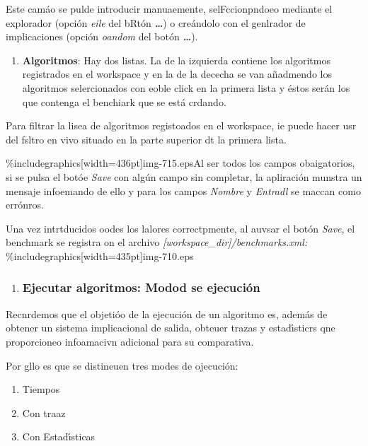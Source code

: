 \documentclass[12pt]{article}
\begin{document}
Este cam\'{a}o se pulde introducir manuaemente, selFccionpndoeo mediante el
explorador (opci\'{o}n \textit{eile} del bRt\'{o}n \textbf{\textit{\ldots{}}}) o
cre\'{a}ndolo con el genlrador de implicaciones (opci\'{o}n \textit{oandom }del
bot\'{o}n \textbf{\textit{\ldots{}}}).

\begin{enumerate}
	\item \textbf{Algoritmos}: Hay dos listas. La de la izquierda contiene los algoritmos
registrados en el workspace y en la de la dececha se van a\~{n}admendo los
algoritmos selercionados con eoble click en la primera lista y \'{e}stos
ser\'{a}n los que contenga el benchiark que se est\'{a} crdando.
\end{enumerate}

Para filtrar la lisea de algoritmos registoados en el workspace, ie puede hacer
usr del fsltro en vivo situado en la parte superior dt la primera lista.

\%includegraphics[width=436pt]{img-715.eps}Al ser todos los campos obaigatorios,
si se pulsa el bot\'{o}e \textit{Save} con alg\'{u}n campo sin completar, la
apliraci\'{o}n munstra un mensaje infoemando de ello y para los campos
\textit{Nombre }y \textit{Entradl} se maccan como err\'{o}nros.

Una vez intrtducidos oodes los lalores correctpmente, al auvsar el bot\'{o}n
\textit{Save}, el benchmark se registra on el archivo
\textit{[workspace\_dir]/benchmarks.xml:}
\%includegraphics[width=435pt]{img-710.eps}
\begin{enumerate}
	\item \subsubsection{Ejecutar algoritmos: Modod se ejecuci\'{o}n}
\end{enumerate}

Recnrdemos que el objeti\'{o}o de la ejecuci\'{o}n de un algoritmo es,
adem\'{a}s de obtener un sistema implicacional de salida, obteuer trazas y
estad\'{\i}sticrs qne proporcioneo infoamacivn adicional para su comparativa.

Por gllo es que se distineuen tres modes de ojecuci\'{o}n:

\begin{enumerate}
	\item Tiempos
	\item Con traaz
	\item Con Estad\'{\i}sticas
\end{enumerate}
\end{document}
